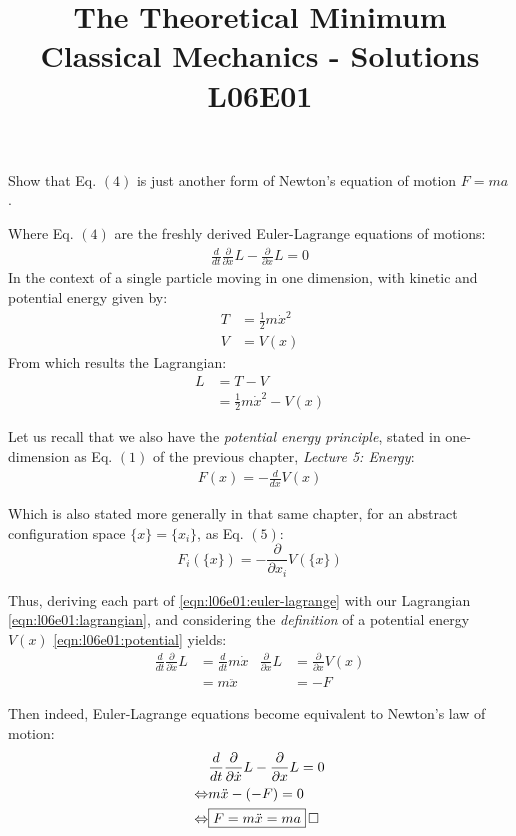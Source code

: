 \documentclass[solutions.tex]{subfiles}
\title{The Theoretical Minimum \\
	{\Large Classical Mechanics - Solutions} \\
	{\large L06E01}
}
\begin{document}
\maketitle
\begin{exercise}
Show that Eq. $(4)$ is just another form of Newton's
equation of motion $F = ma$.
\end{exercise}
Where Eq. $(4)$ are the freshly derived Euler-Lagrange
equations of motions:
\begin{align}
	\frac{d}{dt}\frac{\partial}{\partial\dot{x}}L - \frac{\partial}{\partial x}L = 0
	\label{eqn:l06e01:euler-lagrange}
\end{align}
In the context of a single particle moving in one dimension, with
kinetic and potential energy given by:
\begin{align*}
	T &= \frac{1}{2} m\dot{x}^2 \\
	V &= V(x)
\end{align*}
From which results the Lagrangian:
\begin{align}
	L &= T-V \nonumber\\
	~ &= \frac{1}{2}m\dot{x}^2-V(x)
	\label{eqn:l06e01:lagrangian}
\end{align}

Let us recall that we also have the \textit{potential energy
principle}, stated in one-dimension as Eq. $(1)$ of the previous
chapter, \textit{Lecture 5: Energy}:
\begin{align}
	F(x) = -\frac{d}{dx}V(x)
	\label{eqn:l06e01:potential}
\end{align}

Which is also stated more generally in that same chapter, for an
abstract configuration space $\{x\} = \{x_i\}$, as Eq. $(5)$:
\[
	F_i(\{x\}) = -\frac{\partial}{\partial x_i}V(\{x\})
\]

Thus, deriving each part of \eqref{eqn:l06e01:euler-lagrange} with
our Lagrangian \eqref{eqn:l06e01:lagrangian}, and considering the
\textit{definition} of a potential energy $V(x)$ \eqref{eqn:l06e01:potential}
yields:
\begin{align*}
	\frac{d}{dt}\frac{\partial}{\partial\dot{x}}L &=
		\frac{d}{dt}m\dot{x} &
	\frac{\partial}{\partial x}L &=
		\frac{\partial}{\partial x}V(x) \\
	~ &= m\ddot{x} & ~ &= -F
\end{align*}

Then indeed, Euler-Lagrange equations become equivalent to Newton's law of motion:
\begin{align*}
	~ & \frac{d}{dt}\frac{\partial}{\partial\dot{x}}L - \frac{\partial}{\partial x}L = 0 \\
	\Leftrightarrow & m\ddot{x}-(-F) = 0 \\
	\Leftrightarrow & \boxed{F = m\ddot{x} = ma} \qed
\end{align*}
\end{document}
